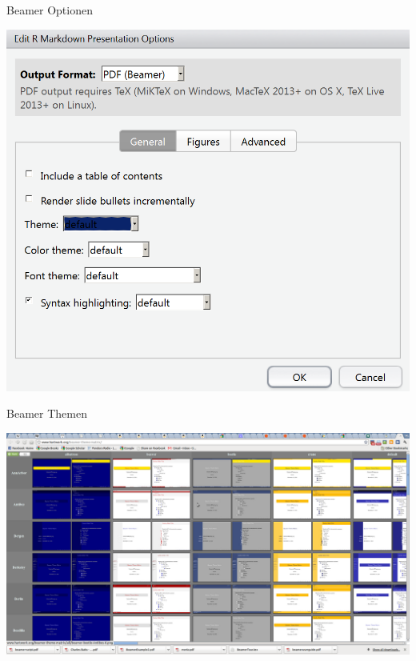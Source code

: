 \documentclass[ignorenonframetext,]{beamer}
\begin{document}
\begin{frame}{Beamer Optionen}

\includegraphics{./tex2pdf.956/55b0e29739cdff708c7f3c907c10eac9ce2400d4.png}

\end{frame}

\begin{frame}{Beamer Themen}

\includegraphics{./tex2pdf.956/205295da04c63e392ef666ca64d3c59930e4e603.png}

\end{frame}
\end{document}
